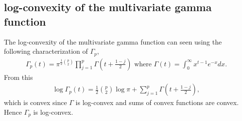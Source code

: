 \documentclass{article}\usepackage[]{graphicx}\usepackage[]{color}
\begin{document}
\subsection{log-convexity of the multivariate gamma function}
\label{sec:multigamma}
The log-convexity of the multivariate gamma function can seen using the following characterization of $\Gamma_p$,
\begin{align}
  \label{eq:multigamma}
  \Gamma_p(t) = \pi^{ \frac{1}{2} \binom{p}{2} }
  \prod_{j = 1}^p \Gamma\!\left(t + \frac{1 - j}{2}\right)
  \text{ where }
  \Gamma(t) = \int_0^\infty x^{t-1} e^{-x} dx.
\end{align}
From this
\begin{align}
  \label{eq:logmultigamma}
  \log\Gamma_p(t) =
  \frac{1}{2}\binom{p}{2} \log\pi +
  \sum_{j = 1}^p \Gamma\left(t + \frac{1-j}{2}\right),
\end{align}
which is convex since $\Gamma$ is log-convex and sums of convex functions are convex.
Hence $\Gamma_p$ is log-convex.
\end{document}
